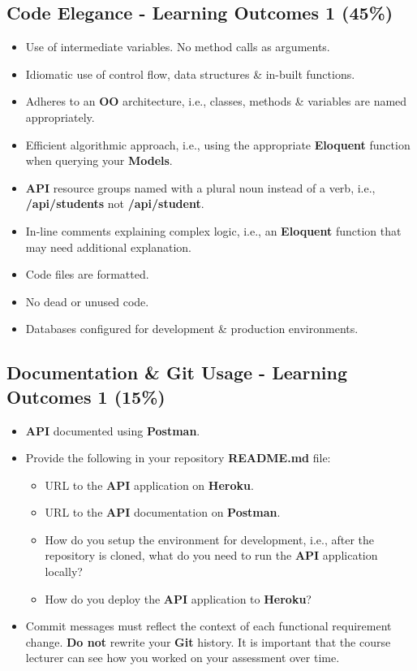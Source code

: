 \documentclass{article}
\begin{document}
\subsection*{Code Elegance - Learning Outcomes 1 (45\%)}
\begin{itemize}
	\item Use of intermediate variables. No method calls as arguments.
	\item Idiomatic use of control flow, data structures \& in-built functions.
	\item Adheres to an \textbf{OO} architecture, i.e., classes, methods \& variables are named appropriately.
	\item Efficient algorithmic approach, i.e., using the appropriate \textbf{Eloquent} function when querying your \textbf{Models}.
	\item \textbf{API} resource groups named with a plural noun instead of a verb, i.e., \textbf{/api/students} not \textbf{/api/student}.
	\item In-line comments explaining complex logic, i.e., an \textbf{Eloquent} function that may need additional explanation.
	\item Code files are formatted.
	\item No dead or unused code.
	\item Databases configured for development \& production environments.
\end{itemize}

\subsection*{Documentation \& Git Usage - Learning Outcomes 1 (15\%)}
\begin{itemize}
  \item \textbf{API} documented using \textbf{Postman}.
	\item Provide the following in your repository \textbf{README.md} file:
	      \begin{itemize}
		      \item URL to the \textbf{API} application on \textbf{Heroku}.
		      \item URL to the \textbf{API} documentation on \textbf{Postman}.
		      \item How do you setup the environment for development, i.e., after the repository is cloned, what do you need to run the \textbf{API} application locally?
					\item How do you deploy the \textbf{API} application to \textbf{Heroku}?
	      \end{itemize}
			\end{itemize}
			\begin{itemize}
	\item Commit messages must reflect the context of each functional requirement change. \textbf{Do not} rewrite your \textbf{Git} history. It is important that the course lecturer can see how you worked on your assessment over time.
\end{itemize}
\end{document}
